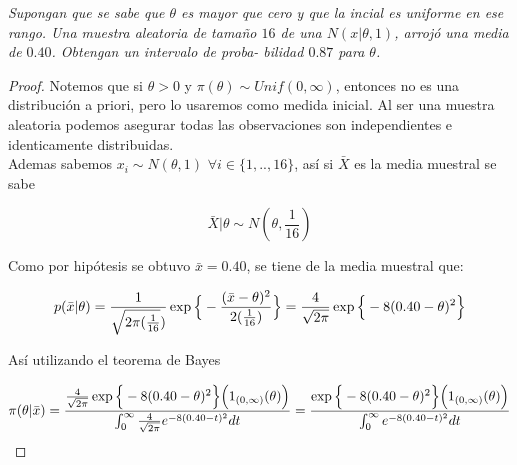\documentclass[11pt,letterpaper]{article}
\begin{document}
\newpage
\begin{tcolorbox}[
    title = \textcolor{white}{\textbf{Problema 2}},
    colbacktitle=AzulUNAM!95!black,         %
    coltitle=white,                         %
    colback=OroUNAM!7!white,                %
    colframe=OroUNAM!90!black,              %
    fontupper=\small
]
\textit{Supongan que se sabe que $\theta$ es mayor que cero y que la incial es
uniforme en ese rango. Una muestra aleatoria de tamaño $16$ de una
$N (x|\theta,1)$, arrojó una media de $0.40$. Obtengan un intervalo de proba-
bilidad $0.87$ para $\theta$.}
\end{tcolorbox}

\begin{proof}

    Notemos que si $\theta>0$ y $\pi(\theta)\sim Unif(0,\infty)$, entonces no es una distribución a priori, pero lo usaremos como medida inicial. Al ser una muestra aleatoria podemos asegurar todas las observaciones son independientes e identicamente distribuidas.\\ 

    Ademas sabemos $x_i\sim N(\theta,1)$ $\forall i \in \{1,..,16\}$, así si $\bar{X}$ es la media muestral se sabe

    \begin{equation*}
        \bar{X}|\theta \sim N(\theta,\frac{1}{16})
    \end{equation*}

    Como por hipótesis se obtuvo $\bar{x}=0.40$, se tiene de la media muestral que:

    \begin{equation*}
    p(\bar{x}|\theta)=\frac{1}{\sqrt{2\pi(\frac{1}{16}})}\exp\Big{\{}-\frac{(\bar{x}-\theta)^2}{2(\frac{1}{16})}\Big{\}}=\frac{4}{\sqrt{2\pi}}\exp\Big{\{}-8(0.40-\theta)^2\Big{\}}
    \end{equation*}

    Así utilizando el teorema de Bayes

    \begin{equation*}
        \pi(\theta|\bar{x})=\frac{\frac{4}{\sqrt{2\pi}}\exp\Big{\{}-8(0.40-\theta)^2\Big{\}}\Big{(}1_{(0,\infty)}(\theta)\Big{)}}{\int_0^{\infty}\frac{4}{\sqrt{2\pi}}e^{-8(0.40-t)^2}dt}=\frac{\exp\Big{\{}-8(0.40-\theta)^2\Big{\}}\Big{(}1_{(0,\infty)}(\theta)\Big{)}}{\int_0^{\infty}e^{-8(0.40-t)^2}dt}
    \end{equation*}


\end{proof}
\end{document}
